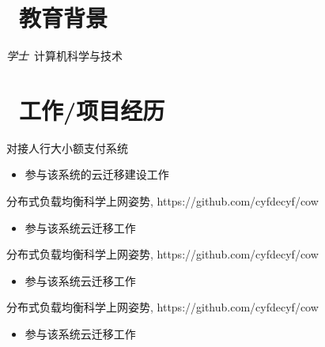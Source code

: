 \documentclass{resume}
\begin{document}


    
    \section{\faGraduationCap\  教育背景}
    \textit{学士}\ 计算机科学与技术

    \section{\faUsers\ 工作/项目经历}

    \begin{onehalfspacing}
    对接人行大小额支付系统
    \begin{itemize}
    \item 参与该系统的云迁移建设工作
    \end{itemize}
    \end{onehalfspacing}

    \begin{onehalfspacing}
    分布式负载均衡科学上网姿势, https://github.com/cyfdecyf/cow
    \begin{itemize}
    \item 参与该系统云迁移工作
    \end{itemize}
    \end{onehalfspacing}

    \begin{onehalfspacing}
    分布式负载均衡科学上网姿势, https://github.com/cyfdecyf/cow
    \begin{itemize}
    \item 参与该系统云迁移工作
    \end{itemize}
    \end{onehalfspacing}

    \begin{onehalfspacing}
    分布式负载均衡科学上网姿势, https://github.com/cyfdecyf/cow
    \begin{itemize}
    \item 参与该系统云迁移工作
    \end{itemize}
    \end{onehalfspacing}
\end{document}
